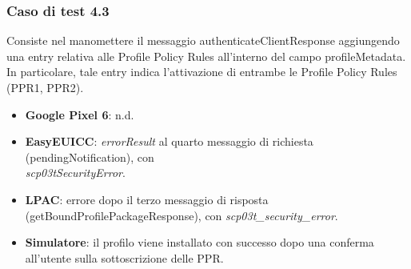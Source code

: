 \documentclass[10pt, oneside]{book}
\begin{document}
\subsubsection{Caso di test 4.3}
Consiste nel manomettere il messaggio authenticateClientResponse aggiungendo una entry relativa alle Profile Policy Rules all'interno del campo profileMetadata. In particolare, tale entry indica l'attivazione di entrambe le Profile Policy Rules (PPR1, PPR2).
\begin{itemize}
\item \textbf{Google Pixel 6}: n.d.
\item \textbf{EasyEUICC}: \textit{errorResult} al quarto messaggio di richiesta (pendingNotification), con\\ \textit{scp03tSecurityError}.
\item \textbf{LPAC}: errore dopo il terzo messaggio di risposta (getBoundProfilePackageResponse), con \textit{scp03t\_security\_error}.
\item \textbf{Simulatore}: il profilo viene installato con successo dopo una conferma all'utente sulla sottoscrizione delle PPR.
\end{itemize}
\end{document}
